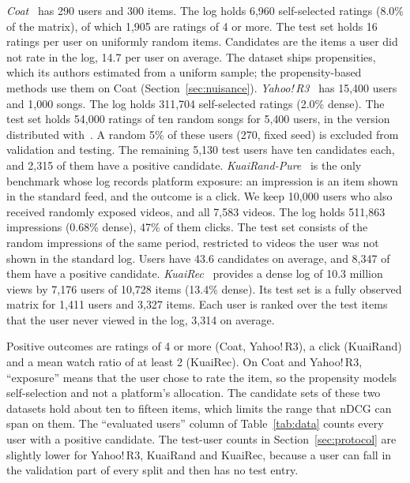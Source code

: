 \emph{Coat}~\citep{schnabel2016} has 290 users and 300 items. The log holds 6{,}960
self-selected ratings (8.0\% of the matrix), of which 1{,}905 are ratings of 4 or more. The test
set holds 16 ratings per user on uniformly random items. Candidates are the items a user did not
rate in the log, 14.7 per user on average. The dataset ships propensities, which its authors estimated from a uniform sample; the
propensity-based methods use them on Coat (Section~\ref{sec:nuisance}).
\emph{Yahoo!\,R3}~\citep{marlin2009collaborative} has 15{,}400 users and 1{,}000 songs. The log holds
311{,}704 self-selected ratings (2.0\% dense). The test set holds 54{,}000 ratings of ten random
songs for 5{,}400 users, in the version distributed with~\citep{chen2021autodebias}. A random 5\%
of these users (270, fixed seed) is excluded from validation and testing. The remaining 5{,}130
test users have ten candidates each, and 2{,}315 of them have a positive candidate.
\emph{KuaiRand-Pure}~\citep{gao2022kuairand} is the only benchmark whose log records platform
exposure: an impression is an item shown in the standard feed, and the outcome is a click. We keep
10{,}000 users who also received randomly exposed videos, and all 7{,}583 videos. The log holds
511{,}863 impressions (0.68\% dense), 47\% of them clicks. The test set consists of the random
impressions of the same period, restricted to videos the user was not shown in the standard log.
Users have 43.6 candidates on average, and 8{,}347 of them have a positive candidate.
\emph{KuaiRec}~\citep{gao2022kuairec} provides a dense log of 10.3 million views by 7{,}176 users of
10{,}728 items (13.4\% dense). Its test set is a fully observed matrix for 1{,}411 users and 3{,}327
items. Each user is ranked over the test items that the user never viewed in the log, 3{,}314 on
average.

Positive outcomes are ratings of 4 or more (Coat, Yahoo!\,R3), a click (KuaiRand) and a mean watch
ratio of at least 2 (KuaiRec). On Coat and Yahoo!\,R3, ``exposure'' means that the user chose to
rate the item, so the propensity models self-selection and not a platform's allocation. The
candidate sets of these two datasets hold about ten to fifteen items, which limits the range that
nDCG can span on them. The ``evaluated users'' column of Table~\ref{tab:data} counts every user with
a positive candidate. The test-user counts in Section~\ref{sec:protocol} are slightly lower for
Yahoo!\,R3, KuaiRand and KuaiRec, because a user can fall in the validation part of every split and
then has no test entry.


